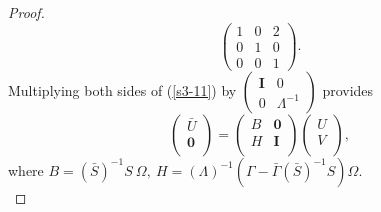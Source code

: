 \documentclass[10pt,a4paper]{amsart}
\begin{document}
\begin{proof}
\begin{equation}
\begin{pmatrix}
1&0&2\\
0&1&0\\
0&0&1
\end{pmatrix}.
\end{equation}
 Multiplying both sides of (\ref{s3-11}) by $\begin{pmatrix}
\mathbf{I}&0\\
0&\Lambda^{-1}\end{pmatrix}$  provides
\begin{equation}\label{142}
\begin{pmatrix}
\bar{U}\\
\textbf{0}\\
\end{pmatrix}=
\begin{pmatrix}
B&\textbf{0}\\
H&\textbf{I}\\
\end{pmatrix}\begin{pmatrix}
U\\
V\\
\end{pmatrix},
\end{equation}
where $B=(\bar{S})^{-1}S~\Omega, ~H=(\Lambda)^{-1}(\Gamma-\bar{\Gamma}(\bar{S})^{-1}S)\Omega$.\\


\end{proof}
\end{document}
